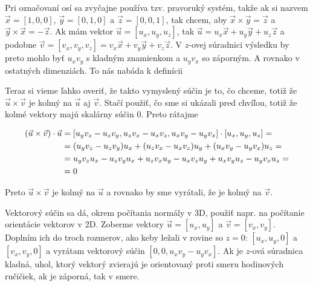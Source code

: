 Pri označovaní osí sa zvyčajne používa tzv. pravoruký systém, takže ak si nazvem
$\vec x=[1,0,0]$, $\vec y=[0,1,0]$ a $\vec z=[0,0,1]$, tak chcem, aby
$\vec x\times\vec y = \vec z$ a $\vec y\times\vec x=-\vec z$.
Ak mám vektor $\vec u=[u_x,u_y,u_z]$, tak 
$\vec u = u_x\vec x+ u_y\vec y+u_z\vec z$ a podobne
$\vec v = [v_x,v_y,v_z] = v_x\vec x+ v_y\vec y+v_z\vec z$.
V $z$-ovej súradnici výsledku by preto mohlo byť $u_xv_y$ s kladným znamienkom 
a $u_yv_x$ so záporným. A rovnako v ostatných dimenziách. To nás nabáda k definícii\\


\centerline{\fbox{$
[u_x,u_y,u_z]\times[v_x,v_y,v_z]=[
  u_yv_z-u_zv_y, 
  u_zv_x-u_xv_z, 
  u_xv_y-u_yv_x
]
$}}


Teraz si vieme ľahko overiť, že takto vymyslený súčin je to, čo chceme, totiž že
$\vec u\times\vec v$ je kolmý na $\vec u$ aj $\vec v$. Stačí použiť, čo sme si ukázali
pred chvíľou, totiž že kolmé vektory majú skalárny súčin $0$.
Preto rátajme


\tikzexternaldisable
\def\nd#1#2{\tikz[remember picture,baseline=(#1.base)]\node[draw=none, inner sep=0pt, outer sep=0pt](#1){\ensuremath{#2}};}

\begin{align*}
  (\vec u\times\vec v)\cdot \vec u &= 
[ u_yv_z-u_zv_y,u_zv_x-u_xv_z, u_xv_y-u_yv_x]\cdot[u_x,u_y,u_z] =\\
  &= (u_yv_z-u_zv_y)u_x+(u_zv_x-u_xv_z)u_y+( u_xv_y-u_yv_x)u_z = \\
  &= \nd{a}{u_yv_zu_x} - \nd{b}{u_zv_yu_x} + \nd{c}{u_zv_xu_y} 
    - \nd{d}{u_xv_zu_y} + \nd{e}{u_xv_yu_z} - \nd{f}{u_yv_xu_z} = \\
  &=0
\end{align*}
\tikzexternalenable

Preto $\vec u\times\vec v$ je kolmý na $\vec u$ a rovnako by sme vyrátali,
že je kolmý na $\vec v$.


Vektorový súčin sa dá, okrem počítania normály v 3D, použiť napr. na počítanie orientácie vektorov v 2D.
Zoberme vektory $\vec u=[u_x,u_y]$ a $\vec v=[v_x,v_y]$. Doplním ich do troch rozmerov, ako keby ležali v rovine
so $z=0$: $[u_x,u_y,0]$ a $[v_x,v_y,0]$ a vyrátam vektorový súčin $[0,0,u_xv_y-u_yv_x]$. Ak je $z$-ová súradnica
kladná, uhol, ktorý vektorý zvierajú je orientovaný proti smeru hodinových ručičiek, ak je záporná, tak v smere.


